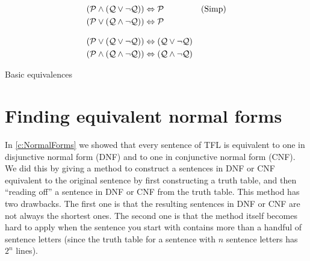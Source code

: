 \begin{table}
\begin{align*}
(\mathcal{P} \land (\mathcal{Q} \lor \lnot\mathcal{Q})) & \Leftrightarrow \mathcal{P}  && \text{(Simp)}\\
(\mathcal{P} \lor (\mathcal{Q} \land \lnot\mathcal{Q})) & \Leftrightarrow \mathcal{P}\\[2ex]
(\mathcal{P} \lor (\mathcal{Q} \lor \lnot\mathcal{Q})) & \Leftrightarrow (\mathcal{Q} \lor \lnot\mathcal{Q}) \\
(\mathcal{P} \land (\mathcal{Q} \land \lnot\mathcal{Q})) & \Leftrightarrow (\mathcal{Q} \land \lnot\mathcal{Q})
\end{align*}
\caption{Basic equivalences}
\label{tab:equivalences}
\end{table}

\section{Finding equivalent normal forms}

In \cref{c:NormalForms} we showed that every sentence of TFL is equivalent to one in disjunctive normal form (DNF) and to one in conjunctive normal form (CNF).  We did this by giving a method to construct a sentences in DNF or CNF equivalent to the original sentence by first constructing a truth table, and then ``reading off'' a sentence in DNF or CNF from the truth table.  This method has two drawbacks. The first one is that the resulting sentences in DNF or CNF are not always the shortest ones.  The second one is that the method itself becomes hard to apply when the sentence you start with contains more than a handful of sentence letters (since the truth table for a sentence with $n$ sentence letters has $2^n$ lines).

